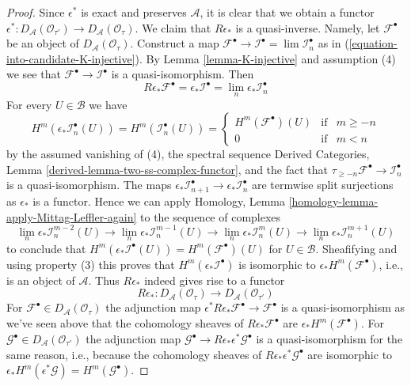\begin{proof}
\medskip\noindent
Since $\epsilon^*$ is exact and preserves $\mathcal{A}$, it is clear that
we obtain a functor $\epsilon^* : D_\mathcal{A}(\mathcal{O}_{\tau'}) \to
D_\mathcal{A}(\mathcal{O}_\tau)$. We claim that $R\epsilon_*$ is a
quasi-inverse. Namely, let $\mathcal{F}^\bullet$ be an
object of $D_\mathcal{A}(\mathcal{O}_\tau)$. Construct a map
$\mathcal{F}^\bullet \to \mathcal{I}^\bullet = \lim \mathcal{I}_n^\bullet$
as in (\ref{equation-into-candidate-K-injective}). By
Lemma \ref{lemma-K-injective} and assumption (4) we see that
$\mathcal{F}^\bullet \to \mathcal{I}^\bullet$ is a quasi-isomorphism.
Then
$$
R\epsilon_*\mathcal{F}^\bullet = \epsilon_*\mathcal{I}^\bullet =
\lim_n \epsilon_*\mathcal{I}_n^\bullet
$$
For every $U \in \mathcal{B}$ we have
$$
H^m(\epsilon_*\mathcal{I}_n^\bullet(U)) =
H^m(\mathcal{I}_n^\bullet(U)) =
\left\{
\begin{matrix}
H^m(\mathcal{F}^\bullet)(U) & \text{if} & m \geq -n \\
0 & \text{if} & m < n
\end{matrix}
\right.
$$
by the assumed vanishing of (4), the spectral sequence
Derived Categories, Lemma \ref{derived-lemma-two-ss-complex-functor},
and the fact that
$\tau_{\geq -n}\mathcal{F}^\bullet \to \mathcal{I}_n^\bullet$
is a quasi-isomorphism. The maps
$\epsilon_*\mathcal{I}_{n + 1}^\bullet \to \epsilon_*\mathcal{I}_n^\bullet$
are termwise split surjections as $\epsilon_*$ is a functor.
Hence we can apply
Homology, Lemma \ref{homology-lemma-apply-Mittag-Leffler-again}
to the sequence of complexes
$$
\lim_n \epsilon_*\mathcal{I}_n^{m - 2}(U) \to
\lim_n \epsilon_*\mathcal{I}_n^{m - 1}(U) \to
\lim_n \epsilon_*\mathcal{I}_n^m(U) \to
\lim_n \epsilon_*\mathcal{I}_n^{m + 1}(U)
$$
to conclude that
$H^m(\epsilon_*\mathcal{I}^\bullet(U)) = H^m(\mathcal{F}^\bullet)(U)$
for $U \in \mathcal{B}$.
Sheafifying and using property (3) this proves that
$H^m(\epsilon_*\mathcal{I}^\bullet)$ is isomorphic
to $\epsilon_*H^m(\mathcal{F}^\bullet)$, i.e., is an object of
$\mathcal{A}$. Thus $R\epsilon_*$ indeed gives rise to a functor
$$
R\epsilon_* : 
D_\mathcal{A}(\mathcal{O}_\tau)
\longrightarrow
D_\mathcal{A}(\mathcal{O}_{\tau'})
$$
For $\mathcal{F}^\bullet \in D_\mathcal{A}(\mathcal{O}_\tau)$
the adjunction map
$\epsilon^*R\epsilon_*\mathcal{F}^\bullet \to \mathcal{F}^\bullet$
is a quasi-isomorphism as we've seen above that the cohomology sheaves
of $R\epsilon_*\mathcal{F}^\bullet$ are
$\epsilon_*H^m(\mathcal{F}^\bullet)$. For
$\mathcal{G}^\bullet \in D_\mathcal{A}(\mathcal{O}_{\tau'})$ the
adjunction map
$\mathcal{G}^\bullet \to R\epsilon_*\epsilon^*\mathcal{G}^\bullet$
is a quasi-isomorphism for the same reason, i.e., because
the cohomology sheaves of $R\epsilon_*\epsilon^*\mathcal{G}^\bullet$
are isomorphic to
$\epsilon_*H^m(\epsilon^*\mathcal{G}) = H^m(\mathcal{G}^\bullet)$.
\end{proof}









